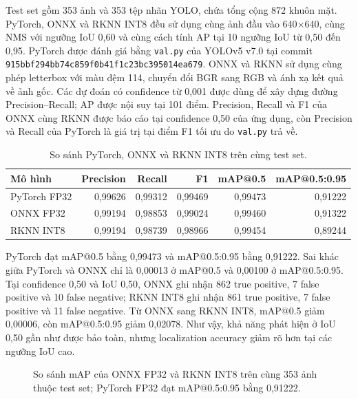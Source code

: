 \documentclass[11pt,a4paper]{article}
\begin{document}
Test set gồm 353 ảnh và 353 tệp nhãn YOLO, chứa tổng cộng 872 khuôn mặt. PyTorch, ONNX và RKNN INT8 đều sử dụng cùng ảnh đầu vào 640$\times$640, cùng NMS với ngưỡng IoU 0,60 và cùng cách tính AP tại 10 ngưỡng IoU từ 0,50 đến 0,95. PyTorch được đánh giá bằng \texttt{val.py} của YOLOv5 v7.0 tại commit \texttt{915bbf294bb74c859f0b41f1c23bc395014ea679}. ONNX và RKNN sử dụng cùng phép letterbox với màu đệm 114, chuyển đổi BGR sang RGB và ánh xạ kết quả về ảnh gốc. Các dự đoán có confidence từ 0,001 được dùng để xây dựng đường Precision--Recall; AP được nội suy tại 101 điểm. Precision, Recall và F1 của ONNX cùng RKNN được báo cáo tại confidence 0,50 của ứng dụng, còn Precision và Recall của PyTorch là giá trị tại điểm F1 tối ưu do \texttt{val.py} trả về.

\begin{table}[H]
\centering
\caption{So sánh PyTorch, ONNX và RKNN INT8 trên cùng test set.}
\label{tab:rknn-test}
\small
\begin{tabular}{lrrrrr}
\toprule
Mô hình & Precision & Recall & F1 & mAP@0.5 & mAP@0.5:0.95 \\
\midrule
PyTorch FP32 & 0,99626 & 0,99312 & 0,99469 & 0,99473 & 0,91222 \\
ONNX FP32 & 0,99194 & 0,98853 & 0,99024 & 0,99460 & 0,91322 \\
RKNN INT8 & 0,99194 & 0,98739 & 0,98966 & 0,99454 & 0,89244 \\
\bottomrule
\end{tabular}
\end{table}

PyTorch đạt mAP@0.5 bằng 0,99473 và mAP@0.5:0.95 bằng 0,91222. Sai khác giữa PyTorch và ONNX chỉ là 0,00013 ở mAP@0.5 và 0,00100 ở mAP@0.5:0.95. Tại confidence 0,50 và IoU 0,50, ONNX ghi nhận 862 true positive, 7 false positive và 10 false negative; RKNN INT8 ghi nhận 861 true positive, 7 false positive và 11 false negative. Từ ONNX sang RKNN INT8, mAP@0.5 giảm 0,00006, còn mAP@0.5:0.95 giảm 0,02078. Như vậy, khả năng phát hiện ở IoU 0,50 gần như được bảo toàn, nhưng localization accuracy giảm rõ hơn tại các ngưỡng IoU cao.

\begin{figure}[H]
\centering
{}
\caption{So sánh mAP của ONNX FP32 và RKNN INT8 trên cùng 353 ảnh thuộc test set; PyTorch FP32 đạt mAP@0.5:0.95 bằng 0,91222.}
\label{fig:accuracy-comparison}
\end{figure}
\end{document}
